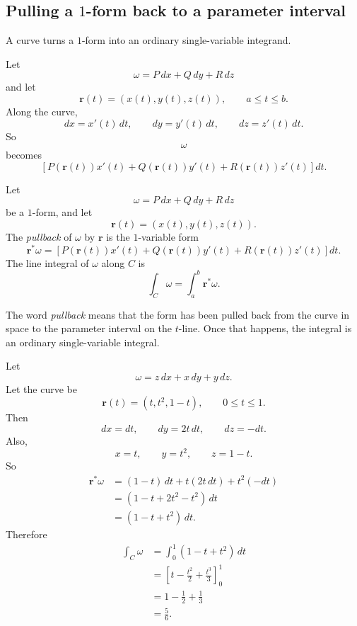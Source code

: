 \subsection{Pulling a \(1\)-form back to a parameter interval}

A curve turns a \(1\)-form into an ordinary single-variable integrand.

Let
\[
    \omega=P\,dx+Q\,dy+R\,dz
\]
and let
\[
    \mathbf r(t)=(x(t),y(t),z(t)),
    \qquad
    a\le t\le b.
\]
Along the curve,
\[
    dx=x'(t)\,dt,
    \qquad
    dy=y'(t)\,dt,
    \qquad
    dz=z'(t)\,dt.
\]
So
\[
\omega
\]
becomes
\[
\left[
P(\mathbf r(t))x'(t)
+
Q(\mathbf r(t))y'(t)
+
R(\mathbf r(t))z'(t)
\right]dt.
\]

\begin{definition}
Let
\[
    \omega=P\,dx+Q\,dy+R\,dz
\]
be a \(1\)-form, and let
\[
    \mathbf r(t)=(x(t),y(t),z(t)).
\]
The \emph{pullback} of \(\omega\) by \(\mathbf r\) is the \(1\)-variable form
\[
\boxed{
    \mathbf r^*\omega
    =
    \left[
    P(\mathbf r(t))x'(t)
    +
    Q(\mathbf r(t))y'(t)
    +
    R(\mathbf r(t))z'(t)
    \right]dt.
}
\]
The line integral of \(\omega\) along \(C\) is
\[
\boxed{
    \int_C \omega
    =
    \int_a^b \mathbf r^*\omega.
}
\]
\end{definition}

The word \emph{pullback} means that the form has been pulled back from the curve in
space to the parameter interval on the \(t\)-line.  Once that happens, the integral is an
ordinary single-variable integral.

\begin{example}
Let
\[
    \omega=z\,dx+x\,dy+y\,dz.
\]
Let the curve be
\[
    \mathbf r(t)=(t,t^2,1-t),
    \qquad
    0\le t\le1.
\]
Then
\[
    dx=dt,
    \qquad
    dy=2t\,dt,
    \qquad
    dz=-dt.
\]
Also,
\[
    x=t,\qquad y=t^2,\qquad z=1-t.
\]
So
\[
\begin{aligned}
\mathbf r^*\omega
&=
(1-t)\,dt+t(2t\,dt)+t^2(-dt)\\
&=
(1-t+2t^2-t^2)\,dt\\
&=
(1-t+t^2)\,dt.
\end{aligned}
\]
Therefore
\[
\begin{aligned}
\int_C \omega
&=
\int_0^1(1-t+t^2)\,dt\\
&=
\left[t-\frac{t^2}{2}+\frac{t^3}{3}\right]_0^1\\
&=
1-\frac12+\frac13\\
&=
\frac56.
\end{aligned}
\]
\end{example}

